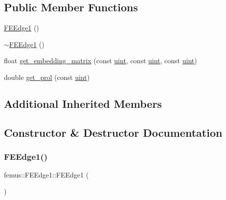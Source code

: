 \subsection*{Public Member Functions}
\begin{DoxyCompactItemize}
\item 
\mbox{\hyperlink{classfemus_1_1_f_e_edge1_aa9abaab903c04fcfece3ce921ad0af6a}{F\+E\+Edge1}} ()
\item 
\mbox{\hyperlink{classfemus_1_1_f_e_edge1_a9f830645f2b38043f3d753505271679e}{$\sim$\+F\+E\+Edge1}} ()
\item 
float \mbox{\hyperlink{classfemus_1_1_f_e_edge1_a25ca224b3f755062f03cc12d9da92a9a}{get\+\_\+embedding\+\_\+matrix}} (const \mbox{\hyperlink{_typedefs_8hpp_a91ad9478d81a7aaf2593e8d9c3d06a14}{uint}}, const \mbox{\hyperlink{_typedefs_8hpp_a91ad9478d81a7aaf2593e8d9c3d06a14}{uint}}, const \mbox{\hyperlink{_typedefs_8hpp_a91ad9478d81a7aaf2593e8d9c3d06a14}{uint}})
\item 
double \mbox{\hyperlink{classfemus_1_1_f_e_edge1_a65a8e90e45a7db19520776609184a51f}{get\+\_\+prol}} (const \mbox{\hyperlink{_typedefs_8hpp_a91ad9478d81a7aaf2593e8d9c3d06a14}{uint}})
\end{DoxyCompactItemize}
\subsection*{Additional Inherited Members}


\subsection{Constructor \& Destructor Documentation}
\mbox{\label{classfemus_1_1_f_e_edge1_aa9abaab903c04fcfece3ce921ad0af6a}} 
\subsubsection{\texorpdfstring{F\+E\+Edge1()}{FEEdge1()}}
{\footnotesize\ttfamily femus\+::\+F\+E\+Edge1\+::\+F\+E\+Edge1 (\begin{DoxyParamCaption}{ }\end{DoxyParamCaption})}

\mbox{\label{classfemus_1_1_f_e_edge1_a9f830645f2b38043f3d753505271679e}} 
